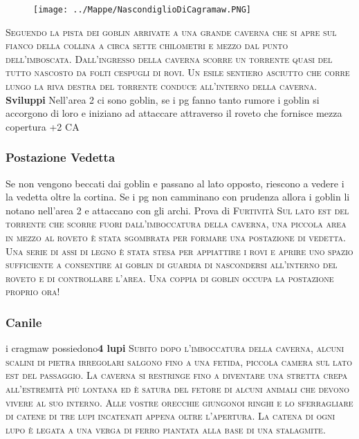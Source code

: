 \documentclass{article}
\begin{document}
    \newpage
    \begin{figure}[t]
        \texttt{[image: ../Mappe/NascondiglioDiCagramaw.PNG]}
    \end{figure}
        \textsc{Seguendo la pista dei goblin arrivate a una grande caverna che
si apre sul fianco della collina a circa sette chilometri e mezzo
dal punto dell’imboscata. Dall’ingresso della caverna scorre
un torrente quasi del tutto nascosto da folti cespugli di rovi.
Un esile sentiero asciutto che corre lungo la riva destra del
torrente conduce all’interno della caverna.}
\newline
\textbf{Sviluppi}
\newline
Nell'area 2 ci sono goblin, se i pg fanno tanto rumore i goblin si accorgono di loro e iniziano ad attaccare attraverso il roveto che fornisce mezza copertura +2 CA 
\subsubsection{Postazione Vedetta}
Se non vengono beccati dai goblin e passano al lato opposto, riescono a vedere i la vedetta oltre la cortina. Se i pg non camminano con prudenza allora i goblin li notano nell'area 2 e attaccano con gli archi. Prova di \textsc{Furtività} \newline \textsc{Sul lato est del torrente che scorre fuori dall’imboccatura della
caverna, una piccola area in mezzo al roveto è stata sgombrata
per formare una postazione di vedetta. Una serie di assi di
legno è stata stesa per appiattire i rovi e aprire uno spazio
sufficiente a consentire ai goblin di guardia di nascondersi
all’interno del roveto e di controllare l’area. Una coppia di
goblin occupa la postazione proprio ora!}



\subsubsection{Canile}
i cragmaw possiedono\textbf{4 lupi} \newline
\textsc{Subito dopo l’imboccatura della caverna, alcuni scalini di
pietra irregolari salgono fino a una fetida, piccola camera sul
lato est del passaggio. La caverna si restringe fino a diventare
una stretta crepa all’estremità più lontana ed è satura del
fetore di alcuni animali che devono vivere al suo interno. Alle
vostre orecchie giungonoi ringhi e lo sferragliare di catene di
tre lupi incatenati appena oltre l'apertura. La catena di ogni
lupo è legata a una verga di ferro piantata alla base di una
stalagmite.}\newline
\end{document}
